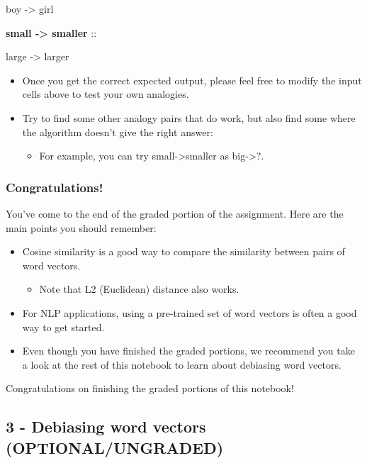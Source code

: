 \documentclass[11pt]{article}
\begin{document}
boy -\textgreater{} girl

\textbf{small -\textgreater{} smaller } ::

large -\textgreater{} larger

    \begin{itemize}
\itemsep1pt\parskip0pt
\item
  Once you get the correct expected output, please feel free to modify
  the input cells above to test your own analogies.
\item
  Try to find some other analogy pairs that do work, but also find some
  where the algorithm doesn't give the right answer:

  \begin{itemize}
  \itemsep1pt\parskip0pt
  \item
    For example, you can try small-\textgreater{}smaller as
    big-\textgreater{}?.
  \end{itemize}
\end{itemize}

    \subsubsection{Congratulations!}\label{congratulations}

You've come to the end of the graded portion of the assignment. Here are
the main points you should remember:

\begin{itemize}
\itemsep1pt\parskip0pt
\item
  Cosine similarity is a good way to compare the similarity between
  pairs of word vectors.

  \begin{itemize}
  \itemsep1pt\parskip0pt
  \item
    Note that L2 (Euclidean) distance also works.
  \end{itemize}
\item
  For NLP applications, using a pre-trained set of word vectors is often
  a good way to get started.
\item
  Even though you have finished the graded portions, we recommend you
  take a look at the rest of this notebook to learn about debiasing word
  vectors.
\end{itemize}

Congratulations on finishing the graded portions of this notebook!

    \subsection{3 - Debiasing word vectors
(OPTIONAL/UNGRADED)}\label{debiasing-word-vectors-optionalungraded}
\end{document}
